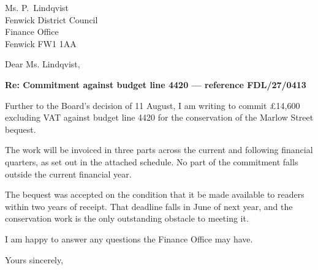 \documentclass[11pt,a4paper]{letter}
\begin{document}
\begin{letter}{
  Ms. P.\ Lindqvist \\
  Fenwick District Council \\
  Finance Office \\
  Fenwick FW1 1AA
}

\opening{Dear Ms. Lindqvist,}

\textbf{Re: Commitment against budget line 4420 --- reference FDL/27/0413}

Further to the Board's decision of 11 August, I am writing to commit £14,600
excluding VAT against budget line 4420 for the conservation of the Marlow Street
bequest.

The work will be invoiced in three parts across the current and following
financial quarters, as set out in the attached schedule. No part of the
commitment falls outside the current financial year.

The bequest was accepted on the condition that it be made available to readers
within two years of receipt. That deadline falls in June of next year, and the
conservation work is the only outstanding obstacle to meeting it.

I am happy to answer any questions the Finance Office may have.

\closing{Yours sincerely,}


\end{letter}
\end{document}
